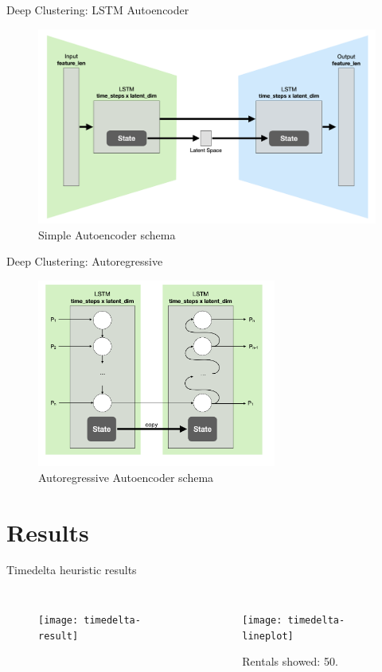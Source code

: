 \documentclass{beamer}
\begin{document}
\begin{frame}{Deep Clustering: LSTM Autoencoder}		
		\begin{figure}[bt]
			\centering
			\includegraphics[width=\textwidth]{lstm-autoencoder-schema}
			\caption{Simple Autoencoder schema}
			\label{fig:lstm-autoencoder-schema}
		\end{figure}
\end{frame}

\begin{frame}{Deep Clustering: Autoregressive}
	\begin{figure}[bt]
		\centering
		\includegraphics[width=0.7\textwidth]{autoregressive-autoencoder-schema}
		\caption{Autoregressive Autoencoder schema}
		\label{fig:autoregressive-autoencoder-schema}
	\end{figure}
\end{frame}

\section{Results}
\begin{frame}{Timedelta heuristic results}
\begin{columns}[t, onlytextwidth]
	\begin{figure}[bt]
		\centering
		\texttt{[image: timedelta-result]}
		\label{fig:timedelta-result}
	\end{figure}
	\begin{figure}[bt]
		\centering
		\texttt{[image: timedelta-lineplot]}
		\label{fig:timedelta-lineplot}
		\caption{Rentals showed: 50.}
	\end{figure}
\end{columns}
\end{frame}
\end{document}
